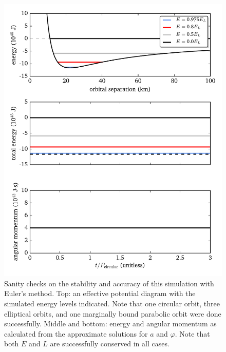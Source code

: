 \documentclass[11pt]{article}
\begin{document}
\begin{figure}[!h]
\centering
\includegraphics[scale=1]{stable_orbit/sanity_checks.pdf}
\caption{\label{fig:sanity_checks} Sanity checks on the stability and accuracy of this simulation with Euler's method. Top: an effective potential diagram with the simulated energy levels indicated. Note that one circular orbit, three elliptical orbits, and one marginally bound parabolic orbit were done successfully. Middle and bottom: energy and angular momentum as calculated from the approximate solutions for $a$ and $\varphi$. Note that both $E$ and $L$ are successfully conserved in all cases.}
\end{figure}
\end{document}
